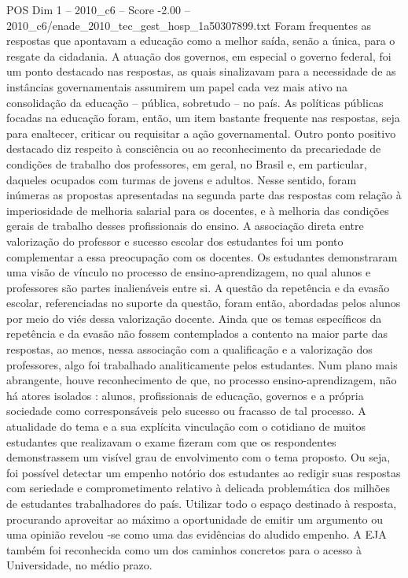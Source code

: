 \begin{textsample}{POS Dim 1 – 2010\_c6 – Score -2.00 – 2010\_c6/enade\_2010\_tec\_gest\_hosp\_1a50307899.txt}
Foram frequentes as respostas que apontavam a educação como a melhor saída, senão a única, para o resgate da cidadania.
A atuação dos governos, em especial o governo federal, foi um ponto destacado nas respostas, as quais sinalizavam para a necessidade de as instâncias governamentais assumirem um papel cada vez mais ativo na consolidação da educação – pública, sobretudo – no país.
As políticas públicas focadas na educação foram, então, um item bastante frequente nas respostas, seja para enaltecer, criticar ou requisitar a ação governamental.
Outro ponto positivo destacado diz respeito à consciência ou ao reconhecimento da precariedade de condições de trabalho dos professores, em geral, no Brasil e, em particular, daqueles ocupados com turmas de jovens e adultos.
Nesse sentido, foram inúmeras as propostas apresentadas na segunda parte das respostas com relação à imperiosidade de melhoria salarial para os docentes, e à melhoria das condições gerais de trabalho desses profissionais do ensino.
A associação direta entre valorização do professor e sucesso escolar dos estudantes foi um ponto complementar a essa preocupação com os docentes.
Os estudantes demonstraram uma visão de vínculo no processo de ensino-aprendizagem, no qual alunos e professores são partes inalienáveis entre si.
A questão da repetência e da evasão escolar, referenciadas no suporte da questão, foram então, abordadas pelos alunos por meio do viés dessa valorização docente.
Ainda que os temas específicos da repetência e da evasão não fossem contemplados a contento na maior parte das respostas, ao menos, nessa associação com a qualificação e a valorização dos professores, algo foi trabalhado analiticamente pelos estudantes.
Num plano mais abrangente, houve reconhecimento de que, no processo ensino-aprendizagem, não há atores isolados : alunos, profissionais de educação, governos e a própria sociedade como corresponsáveis pelo sucesso ou fracasso de tal processo.
A atualidade do tema e a sua explícita vinculação com o cotidiano de muitos estudantes que realizavam o exame fizeram com que os respondentes demonstrassem um visível grau de envolvimento com o tema proposto.
Ou seja, foi possível detectar um empenho notório dos estudantes ao redigir suas respostas com seriedade e comprometimento relativo à delicada problemática dos milhões de estudantes trabalhadores do país.
Utilizar todo o espaço destinado à resposta, procurando aproveitar ao máximo a oportunidade de emitir um argumento ou uma opinião revelou -se como uma das evidências do aludido empenho.
A EJA também foi reconhecida como um dos caminhos concretos para o acesso à Universidade, no médio prazo.

\end{textsample}
